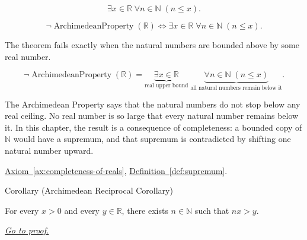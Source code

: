 \begin{remark*}
\[
\exists x\in\mathbb{R}\;\forall n\in\mathbb{N}\;(n\le x).
\]
\end{remark*}

\begin{remark*}
\[
\neg\operatorname{ArchimedeanProperty}(\mathbb{R})\Longleftrightarrow
\exists x\in\mathbb{R}\;\forall n\in\mathbb{N}\;(n\le x).
\]
\end{remark*}

\begin{remark*}
The theorem fails exactly when the natural numbers are bounded above by some real number.
\end{remark*}

\begin{remark*}
\[
\neg\operatorname{ArchimedeanProperty}(\mathbb{R})
=
\underbrace{\exists x\in\mathbb{R}}_{\text{real upper bound}}
\;\underbrace{\forall n\in\mathbb{N}\;(n\le x)}_{\text{all natural numbers remain below it}}.
\]
\end{remark*}

\begin{remark*}[Interpretation]
The Archimedean Property says that the natural numbers do not stop below any real ceiling. No real number is so large that every natural number remains below it. In this chapter, the result is a consequence of completeness: a bounded copy of $\mathbb{N}$ would have a supremum, and that supremum is contradicted by shifting one natural number upward.
\end{remark*}

\begin{remark*}[Dependencies]
\hyperref[ax:completeness-of-reals]{Axiom~\ref*{ax:completeness-of-reals}},
\hyperref[def:supremum]{Definition~\ref*{def:supremum}}.
\end{remark*}
















\begin{corollarybox}{Corollary (Archimedean Reciprocal Corollary)}
\begin{corollary}
\label{cor:archimedean-reciprocal}
For every $x>0$ and every $y\in\mathbb{R}$, there exists $n\in\mathbb{N}$ such that $nx>y$.

\smallskip
\noindent
\hyperref[prf:archimedean-reciprocal]{\textit{Go to proof.}}
\end{corollary}
\end{corollarybox}

